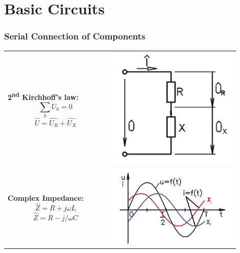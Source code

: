 \documentclass{beamer}
\begin{document}
\section{\texorpdfstring{Basic Circuits}{Basic Circuits}}
	\begin{frame}
    \frametitle{Serial Connection of Components}
		\begin{center}
		\begin{tabular}{m{0.4\linewidth} m{0.5\linewidth}}
			\textbf{2\textsuperscript{nd} Kirchhoff's law:} $$\sum_k U_k = 0$$ $$\hat{U}= \hat{U_R} + \hat{U_X}$$& \includegraphics[scale=0.4]{obr11_obvodSeriovy.png}\\
			\textbf{Complex Impedance:} $$\hat{Z} = R + j\omega L$$ $$\hat{Z} = R - j/\omega C$$& \includegraphics[scale=0.4]{obr12_obvodSeriovyGraf.png}
		\end{tabular}
		\end{center}
  \end{frame}
\end{document}

